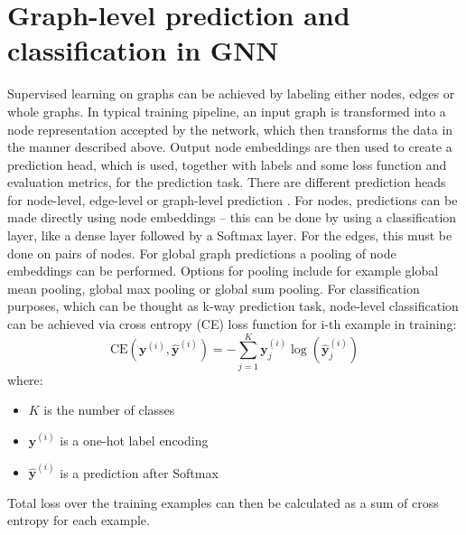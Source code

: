 \section{Graph-level prediction and classification in GNN}
Supervised learning on graphs can be achieved by labeling either nodes, edges or whole graphs. \cite{Lesk2024} In typical training pipeline, an input graph is transformed into a node representation accepted by the network, which then transforms the data in the manner described above. Output node embeddings are then used to create a prediction head, which is used, together with labels and some loss function and evaluation metrics, for the prediction task. There are different prediction heads for node-level, edge-level or graph-level prediction \cite{Lesk2024}. For nodes, predictions can be made directly using node embeddings -- this can be done by using a classification layer, like a dense layer followed by a Softmax layer\cite{sanch2021}.  For the edges, this must be done on pairs of nodes. For global graph predictions a pooling of node embeddings can be performed. Options for pooling include for example global mean pooling, global max pooling or global sum pooling. For classification purposes, which can be thought as k-way prediction task, node-level classification can be achieved via cross entropy (CE) loss function for i-th example in training:
\[\text{CE}({\mathbf{y}}^{(i)}, {\hat{\mathbf{y}}}^{(i)}) = -\sum_{j=1}^{K} {\mathbf{y}}_{j}^{(i)} \log({\hat{\mathbf{y}}}_{j}^{(i)}) \]
where:
\begin{itemize}
    \item $K$ is the number of classes
    \item ${\mathbf{y}}^{(i)}$ is a one-hot label encoding
    \item ${\hat{\mathbf{y}}}^{(i)}$ is a prediction after Softmax
\end{itemize}
Total loss over the training examples can then be calculated as a sum of cross entropy for each example.